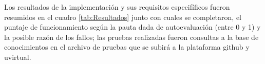 Los resultados de la implementación y sus requisitos especifíficos fueron resumidos 
en el cuadro \ref{tab:Resultados} junto con cuales se completaron, el puntaje de 
funcionamiento según la pauta dada de autoevaluación (entre 0 y 1) y la posible razón de los fallos; las pruebas 
realizadas fueron consultas a la base de conocimientos en el archivo de pruebas que se subirá 
a la plataforma github y uvirtual.